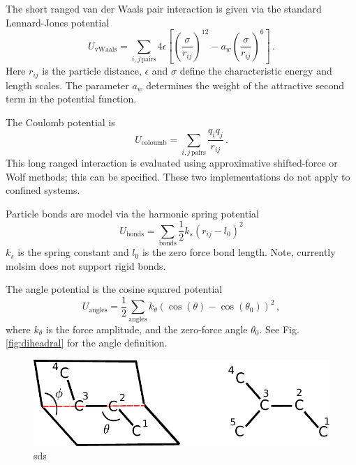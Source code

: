 \documentclass[11pt]{article}
\begin{document}
The short ranged van der Waals pair interaction is given via the standard
Lennard-Jones potential
\begin{equation}
  U_\mathrm{vWaals} =  \sum_{i,j \, \mathrm{pairs}}
  4\epsilon\left[\left(\frac{\sigma}{r_{ij}}\right)^{12} - a_w
    \left(\frac{\sigma}{r_{ij}}\right)^{6}\right] \, .
\end{equation}
Here $r_{ij}$ is the particle distance, $\epsilon$ and $\sigma$ define the
characteristic energy and length scales. The parameter $a_w$ determines the
weight of the attractive second term in the potential function.

The Coulomb potential is 
\begin{equation}
  U_{\mathrm{coloumb}} = \sum_{i,j \, \mathrm{pairs}}\frac{q_iq_j}{r_{ij}} \, .
\end{equation}
This long ranged interaction is evaluated using approximative shifted-force or
Wolf methods; this can be specified. These two implementations do not apply to
confined systems.

Particle bonds are model via the harmonic spring potential
\begin{equation}
  U_{\mathrm{bonds}} =\sum_{\mathrm{bonds}} \frac{1}{2} k_{s}(r_{ij} - l_0)^2
\end{equation}
$k_s$ is the spring constant and $l_0$ is the zero force bond length. Note,
currently \textsf{molsim} does not support rigid bonds.

The angle potential is the cosine squared potential
\begin{equation}
  U_{\mathrm{angles}}=\frac{1}{2}\sum_{\mathrm{angles}} k_{\theta} (\cos(\theta) - \cos(\theta_0))^2 \, ,
\end{equation}
where $k_\theta$ is the force amplitude, and the zero-force angle
$\theta_0$. See Fig. \ref{fig:diheadral} for the angle definition.

\begin{figure}[h]
  \begin{center}
    \includegraphics[scale=.7]{diheadral.pdf}
  \caption{
    \label{fig:dihedral}
    sds
  }
  \end{center}
\end{figure}
\end{document}
